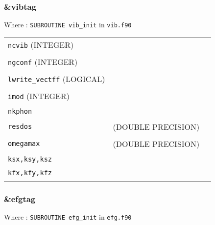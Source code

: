 \documentclass[10pt,a4paper]{article}
\begin{document}
\subsubsection{\&vibtag}

Where : \verb?SUBROUTINE vib_init? in \verb?vib.f90?

\begin{tabular}{lcc}
\\
\verb?ncvib? (INTEGER) & \\
\\
\verb?ngconf? (INTEGER)  & \\
\\
\verb?lwrite_vectff? (LOGICAL)  & \\
\\
\verb?imod? (INTEGER)  & \\
\\
\verb?nkphon? & & \\
\\
\verb?resdos? & (DOUBLE PRECISION) & \\
\\
\verb?omegamax? & (DOUBLE PRECISION) & \\
\\
\verb?ksx,ksy,ksz? & & \\
\\
\verb?kfx,kfy,kfz? & & \\
\\
\end{tabular}


\subsubsection{\&efgtag}

Where : \verb?SUBROUTINE efg_init? in \verb?efg.f90?
\end{document}

